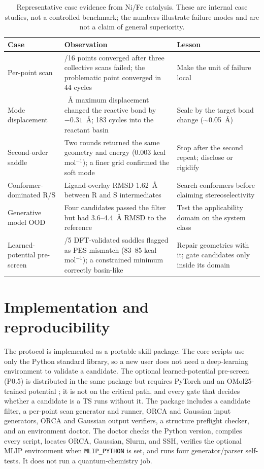 \documentclass[11pt,a4paper]{article}
\begin{document}
\begin{table}[t]
\centering
\caption{Representative case evidence from Ni/Fe catalysis. These are internal case studies, not a controlled benchmark; the numbers illustrate failure modes and are not a claim of general superiority.}
\label{tab:cases}
\small
\begin{tabularx}{\linewidth}{@{}>{\raggedright\arraybackslash}p{3.6cm}>{\raggedright\arraybackslash}X >{\raggedright\arraybackslash}X@{}}
\toprule
Case & Observation & Lesson \\
\midrule
Per-point scan & 16/16 points converged after three collective scans failed; the problematic point converged in 44 cycles & Make the unit of failure local \\
Mode displacement & 0.18~\AA{} maximum displacement changed the reactive bond by $-0.31$~\AA{}; 183 cycles into the reactant basin & Scale by the target bond change ($\sim$0.05~\AA{}) \\
Second-order saddle & Two rounds returned the same geometry and energy (0.003 kcal mol$^{-1}$); a finer grid confirmed the soft mode & Stop after the second repeat; disclose or rigidify \\
Conformer-dominated R/S & Ligand-overlay RMSD 1.62~\AA{} between R and S intermediates & Search conformers before claiming stereoselectivity \\
Generative model OOD & Four candidates passed the filter but had 3.6--4.4~\AA{} RMSD to the reference & Test the applicability domain on the system class \\
Learned-potential pre-screen & 5/5 DFT-validated saddles flagged as PES mismatch (83--85 kcal mol$^{-1}$); a constrained minimum correctly basin-like & Repair geometries with it; gate candidates only inside its domain \\
\bottomrule
\end{tabularx}
\end{table}

\section{Implementation and reproducibility}

The protocol is implemented as a portable skill package. The core scripts use only the Python standard library, so a new user does not need a deep-learning environment to validate a candidate. The optional learned-potential pre-screen (P0.5) is distributed in the same package but requires PyTorch and an OMol25-trained potential \citep{Levine2025OMol25}; it is not on the critical path, and every gate that decides whether a candidate is a TS runs without it. The package includes a candidate filter, a per-point scan generator and runner, ORCA and Gaussian input generators, ORCA and Gaussian output verifiers, a structure preflight checker, and an environment doctor. The doctor checks the Python version, compiles every script, locates ORCA, Gaussian, Slurm, and SSH, verifies the optional MLIP environment when \texttt{MLIP\_PYTHON} is set, and runs four generator/parser self-tests. It does not run a quantum-chemistry job.
\end{document}
